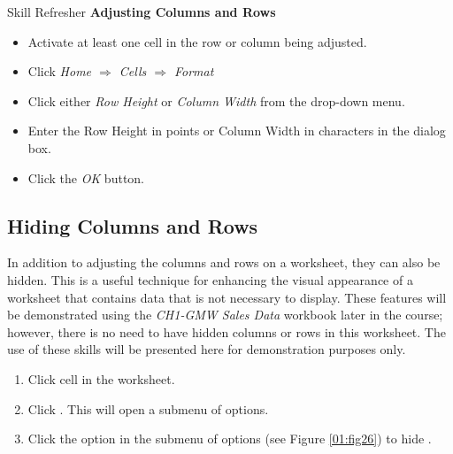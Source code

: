 \begin{center}
	\begin{sklbox}{Skill Refresher}
		\textbf{Adjusting Columns and Rows}
		\\
		\begin{itemize}
			\setlength{\itemsep}{0pt}
			\setlength{\parskip}{0pt}
			\setlength{\parsep}{0pt}
			
			\item Activate at least one cell in the row or column being adjusted.
			\item Click \textit{Home $ \Rightarrow $ Cells $ \Rightarrow $ Format}
			\item Click either \textit{Row Height} or \textit{Column Width} from the drop-down menu.
			\item Enter the Row Height in points or Column Width in characters in the dialog box.
			\item Click the \textit{OK} button.
			
		\end{itemize}
	\end{sklbox}
\end{center}

\subsection{Hiding Columns and Rows}

In addition to adjusting the columns and rows on a worksheet, they can also be hidden. This is a useful technique for enhancing the visual appearance of a worksheet that contains data that is not necessary to display. These features will be demonstrated using the \textit{CH1-GMW Sales Data} workbook later in the course; however, there is no need to have hidden columns or rows in this worksheet. The use of these skills will be presented here for demonstration purposes only.

\begin{enumerate}
	\item Click cell  in the  worksheet.
	\item Click . This will open a submenu of options.
	\item Click the  option in the submenu of options (see Figure \ref{01:fig26}) to hide .
\end{enumerate}


